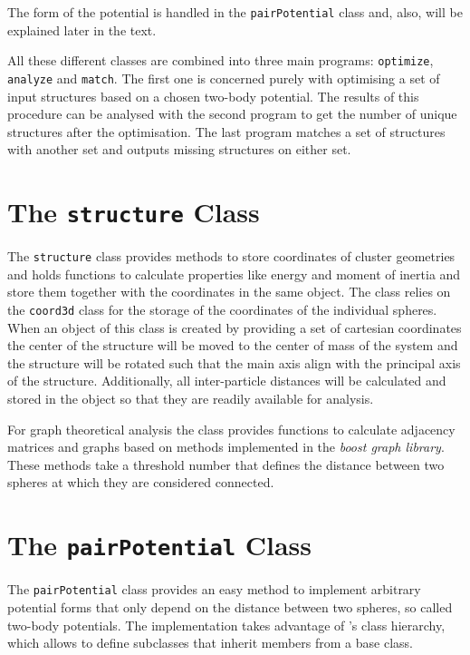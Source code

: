 The form of the potential is handled in the \verb|pairPotential| class and,
also, will be explained later in the text.

All these different classes are combined into three main programs:
\verb|optimize|, \verb|analyze| and \verb|match|. The first one is concerned
purely with optimising a set of input structures based on a chosen two-body
potential. The results of this procedure can be analysed with the second
program to get the number of unique structures after the optimisation. The last
program matches a set of structures with another set and outputs missing
structures on either set.

\section{The \texttt{structure} Class}
\label{sec:thestructureclass}

The \verb|structure| class provides methods to store coordinates of cluster
geometries and holds functions to calculate properties like energy and moment
of inertia and store them together with the coordinates in the same object. The
class relies on the \verb|coord3d| class for the storage of the coordinates of
the individual spheres.  When an object of this class is created by providing a
set of cartesian coordinates the center of the structure will be moved to the
center of mass of the system and the structure will be rotated such that the
main axis align with the principal axis of the structure. Additionally, all
inter-particle distances will be calculated and stored in the object so that
they are readily available for analysis.

For graph theoretical analysis the class provides functions to calculate
adjacency matrices and graphs based on methods implemented in the \textit{boost
graph library}\autocite{_boost_2002}. These methods take a threshold number
that defines the distance between two spheres at which they are considered
connected.

\section{The \texttt{pairPotential} Class}
\label{sec:thepairpotentialclass}

The \texttt{pairPotential} class provides an easy method to implement arbitrary
potential forms that only depend on the distance between two spheres, so called
two-body potentials. The implementation takes advantage of \Cpp's class
hierarchy, which allows to define subclasses that inherit members from a base
class.

